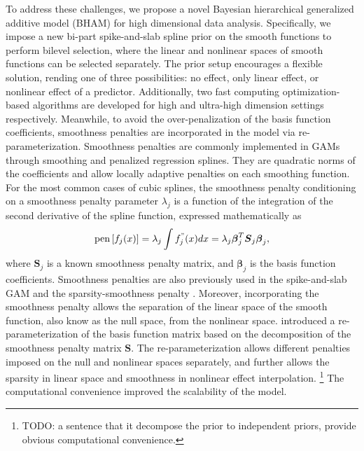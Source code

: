 \documentclass[AMA,STIX1COL,]{WileyNJD-v2}
\begin{document}
To address these challenges, we propose a novel Bayesian hierarchical
generalized additive model (BHAM) for high dimensional data analysis.
Specifically, we impose a new bi-part spike-and-slab spline prior on the
smooth functions to perform bilevel selection, where the linear and
nonlinear spaces of smooth functions can be selected separately. The
prior setup encourages a flexible solution, rending one of three
possibilities: no effect, only linear effect, or nonlinear effect of a
predictor. Additionally, two fast computing optimization-based
algorithms are developed for high and ultra-high dimension settings
respectively. Meanwhile, to avoid the over-penalization of the basis
function coefficients, smoothness penalties are incorporated in the
model via re-parameterization. Smoothness penalties are commonly
implemented in GAMs through smoothing and penalized regression splines.
They are quadratic norms of the coefficients and allow locally adaptive
penalties on each smoothing function. For the most common cases of cubic
splines, the smoothness penalty conditioning on a smoothness penalty
parameter \(\lambda_j\) is a function of the integration of the second
derivative of the spline function, expressed mathematically as
\begin{equation}\label{eq:smoothpen}
  \text{pen}\left[f_j(x)\right] = \lambda_j \int f^{"}_j(x)dx = \lambda_j \boldsymbol{\beta}_j^T \boldsymbol{S}_j \boldsymbol{\beta}_j ,
\end{equation} where \(\boldsymbol{S}_j\) is a known smoothness penalty
matrix, and \(\boldsymbol{\beta}_j\) is the basis function coefficients.
Smoothness penalties are also previously used in the spike-and-slab GAM
\citep{Scheipl2012} and the sparsity-smoothness penalty
\citep{Meier2009}. Moreover, incorporating the smoothness penalty allows
the separation of the linear space of the smooth function, also know as
the null space, from the nonlinear space. \citet{Marra2011} introduced a
re-parameterization of the basis function matrix based on the
decomposition of the smoothness penalty matrix \(\boldsymbol{S}\). The
re-parameterization allows different penalties imposed on the null and
nonlinear spaces separately, and further allows the sparsity in linear
space and smoothness in nonlinear effect interpolation. \footnote{TODO:
  a sentence that it decompose the prior to independent priors, provide
  obvious computational convenience.} The computational convenience
improved the scalability of the model.
\end{document}
